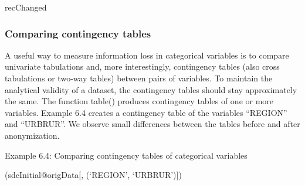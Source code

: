 \documentclass[letterpaper,10pt,english]{sphinxmanual}
\begin{document}
\begin{DUlineblock}{0em}
\item[] 
\item[] recChanged
\end{DUlineblock}

\begin{DUlineblock}{0em}
\item[] 
\item[] 
\end{DUlineblock}


\subsubsection{Comparing contingency tables}
\label{\detokenize{utility:comparing-contingency-tables}}
A useful way to measure information loss in categorical variables is to
compare univariate tabulations and, more interestingly, contingency
tables (also cross tabulations or two-way tables) between pairs of
variables. To maintain the analytical validity of a dataset, the
contingency tables should stay approximately the same. The function
table() produces contingency tables of one or more variables. Example
6.4 creates a contingency table of the variables “REGION” and “URBRUR”.
We observe small differences between the tables before and after
anonymization.

Example 6.4: Comparing contingency tables of categorical variables

\begin{DUlineblock}{0em}
\item[] 
\item[] (sdcInitial@origData{[}, (‘REGION’, ‘URBRUR’){]}) 
\end{DUlineblock}

\begin{DUlineblock}{0em}
\item[] 
\item[] 
\item[] 
\item[] 
\item[] 
\item[] 
\item[] 
\item[] 
\end{DUlineblock}
\end{document}
